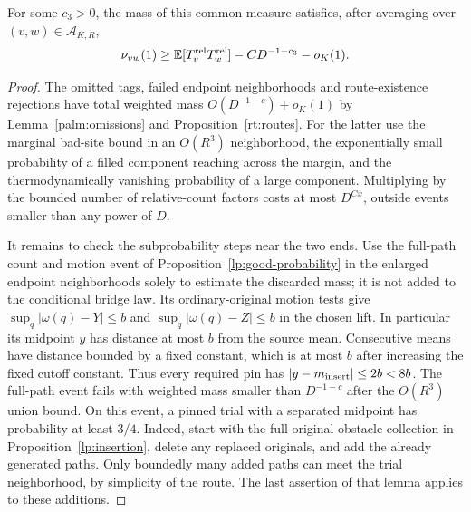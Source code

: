 \begin{lemma}\label{long:mass}
For some $c_3>0$, the mass of this common measure satisfies, after averaging
over $(v,w)\in\mathcal A_{K,R}$,
\begin{equation}\label{long:mass-bound}
 \nu_{vw}(1)\ge
       \mathbb E[T_v^{\rm rel}T_w^{\rm rel}]-C D^{-1-c_3}-o_K(1).
\end{equation}
\end{lemma}
\begin{proof}
The omitted tags, failed endpoint neighborhoods and route-existence
rejections have total weighted mass $O(D^{-1-c})+o_K(1)$ by
Lemma~\ref{palm:omissions} and Proposition~\ref{rt:routes}.  For the latter
use the marginal bad-site bound in an $O(R^3)$ neighborhood, the
exponentially small probability of a filled component reaching across the
margin, and the thermodynamically vanishing probability of a large
component.  Multiplying by the bounded number of relative-count factors
costs at most $D^{Cx}$, outside events smaller than any power of $D$.

It remains to check the subprobability steps near the two ends.  Use the
full-path count and motion event of Proposition~\ref{lp:good-probability} in the
enlarged endpoint neighborhoods solely to estimate the discarded mass;
it is not added to the conditional bridge law.  Its ordinary-original
motion tests give
$\sup_q|\omega(q)-Y|\le b$ and $\sup_q|\omega(q)-Z|\le b$ in the
chosen lift.  In particular its midpoint $y$ has distance at most $b$
from the source mean.  Consecutive means have distance bounded by a fixed
constant, which is at most $b$ after increasing the fixed cutoff constant.
Thus every required pin has $|y-m_{\rm insert}|\le2b<8b$.
The full-path event fails with weighted mass smaller than $D^{-1-c}$
after the $O(R^3)$ union bound.
On this event, a pinned trial with a separated midpoint has probability at
least $3/4$.  Indeed, start with the full original obstacle collection in
Proposition~\ref{lp:insertion}, delete any replaced originals, and add the
already generated paths.  Only boundedly many added paths can meet the
trial neighborhood, by simplicity of the route.  The last assertion of
that lemma applies to these additions.


\end{proof}
